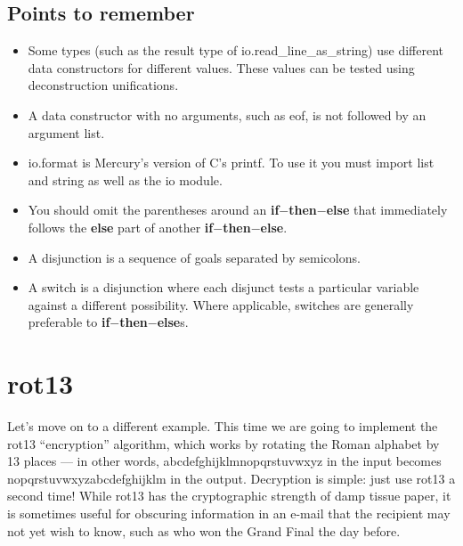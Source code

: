 \documentclass[a4paper,11pt,notitlepage,onecolumn]{book}
\begin{document}
\subsection*{Points to remember}

\begin{itemize}
\item Some types (such as the result type of \textsf{io.read\_line\_as\_string}) use
different data constructors for different values.  These values can be
tested using deconstruction unifications.
\item A data constructor with no arguments, such as \textsf{eof}, is not followed
by an argument list.
\item \textsf{io.format} is Mercury's version of C's \textsf{printf}.  To use it you must
import \textsf{list} and \textsf{string} as well as the \textsf{io} module.
\item You should omit the parentheses around an \textsf{\textbf{if}{\ensuremath{-}}\textbf{then}{\ensuremath{-}}\textbf{else}} that
immediately follows the \textsf{\textbf{else}} part of another \textsf{\textbf{if}{\ensuremath{-}}\textbf{then}{\ensuremath{-}}\textbf{else}}.
\item A disjunction is a sequence of goals separated by semicolons.
\item A switch is a disjunction where each disjunct tests a particular
variable against a different possibility.  Where applicable, switches are
generally preferable to \textsf{\textbf{if}{\ensuremath{-}}\textbf{then}{\ensuremath{-}}\textbf{else}}s.
\end{itemize}





\newpage





\section{\textsf{rot13}}

Let's move on to a different example.  This time we are going to implement
the \textsf{rot13} ``encryption'' algorithm, which works by rotating the Roman
alphabet by 13 places --- in other words, \textsf{abcdefghijklmnopqrstuvwxyz} in
the input becomes \textsf{nopqrstuvwxyzabcdefghijklm} in the output.  Decryption is
simple: just use \textsf{rot13} a second time!  While \textsf{rot13} has the cryptographic
strength of damp tissue paper, it is sometimes useful for obscuring
information in an e-mail that the recipient may not yet wish to know,
such as who won the Grand Final the day before.
\end{document}
